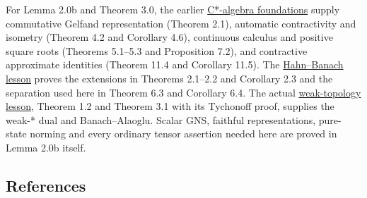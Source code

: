 \documentclass[
  11pt,
]{article}
\begin{document}
For Lemma 2.0b and Theorem 3.0, the earlier
\href{https://kokunoyumeto.github.io/open-math-courses/courses/foundations-of-von-neumann-algebras/c-star-algebras-continuous-functional-calculus-automatic-continuity-positive-cones.html}{C*-algebra
foundations} supply commutative Gelfand representation (Theorem 2.1),
automatic contractivity and isometry (Theorem 4.2 and Corollary 4.6),
continuous calculus and positive square roots (Theorems 5.1--5.3 and
Proposition 7.2), and contractive approximate identities (Theorem 11.4
and Corollary 11.5). The
\href{https://kokunoyumeto.github.io/open-math-courses/courses/foundations-of-von-neumann-algebras/hahn-banach-baire-and-the-basic-theorems-on-banach-spaces.html}{Hahn--Banach
lesson} proves the extensions in Theorems 2.1--2.2 and Corollary 2.3 and
the separation used here in Theorem 6.3 and Corollary 6.4. The actual
\href{https://kokunoyumeto.github.io/open-math-courses/courses/foundations-of-von-neumann-algebras/weak-topologies-tychonoff-banach-alaoglu-mazur-bipolars-krein-milman-and-eberlein-smulian.html}{weak-topology
lesson}, Theorem 1.2 and Theorem 3.1 with its Tychonoff proof, supplies
the weak-* dual and Banach--Alaoglu. Scalar GNS, faithful
representations, pure-state norming and every ordinary tensor assertion
needed here are proved in Lemma 2.0b itself.

\subsection{References}\label{references}
\end{document}
